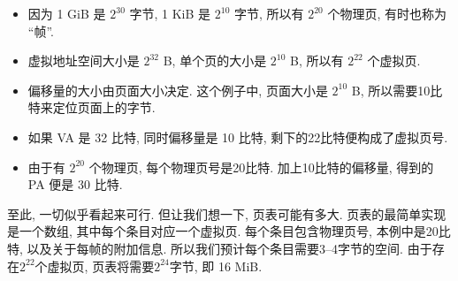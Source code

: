 \documentclass[12pt]{book}
\begin{document}
{\begin{itemize}
%
%
%
%
\item 因为 1 GiB 是 $2^{30}$ 字节, 1 KiB 是 $2^{10}$ 字节, 
  所以有 $2^{20}$ 个物理页, 有时也称为 ``帧''.

\item 虚拟地址空间大小是 $2^{32}$ B, 单个页的大小是 $2^{10}$ B, 
  所以有 $2^{22}$ 个虚拟页.

\item 偏移量的大小由页面大小决定.  这个例子中, 页面大小是 $2^{10}$ B, 
  所以需要10比特来定位页面上的字节.

\item 如果 VA 是 32 比特, 同时偏移量是 10 比特, 剩下的22比特便构成了虚拟页号.

\item 由于有 $2^{20}$ 个物理页, 每个物理页号是20比特. 
  加上10比特的偏移量, 得到的 PA 便是 30 比特.

\end{itemize}
%
至此, 一切似乎看起来可行. 但让我们想一下, 页表可能有多大.
页表的最简单实现是一个数组, 其中每个条目对应一个虚拟页.
每个条目包含物理页号, 本例中是20比特, 以及关于每帧的附加信息.
所以我们预计每个条目需要3--4字节的空间.
由于存在$2^{22}$个虚拟页, 
页表将需要$2^{24}$字节, 即 16 MiB.

}
\end{document}
